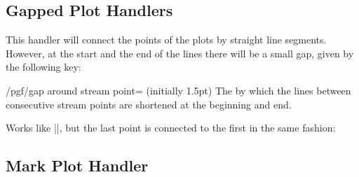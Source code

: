 \subsection{Gapped Plot Handlers}
\label{section-plot-gapped}

\begin{command}{\pgfplothandlergaplineto}
    This handler will connect the points of the plots by straight line
    segments. However, at the start and the end of the lines there will be a
    small gap, given by the following key:
    \begin{key}{/pgf/gap around stream point= (initially 1.5pt)}
        The  by which the lines between consecutive stream
        points are shortened at the beginning and end.
    \end{key}
\begin{codeexample}[]
\end{codeexample}
\end{command}

\begin{command}{\pgfplothandlergapcycle}
    Works like |\pgfplothandlergaplineto|, but the last point is connected to
    the first in the same fashion:
\begin{codeexample}[]
\end{codeexample}
\end{command}


\subsection{Mark Plot Handler}
\label{section-plot-marks}

